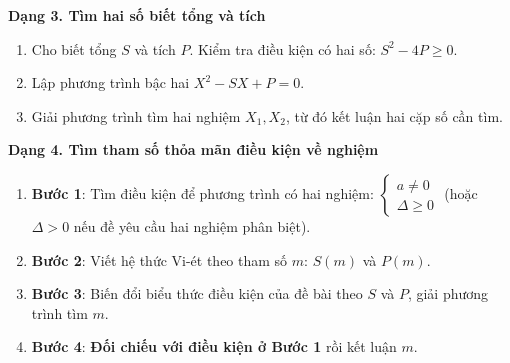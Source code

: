 \textbf{Dạng 3. Tìm hai số biết tổng và tích}
\begin{enumerate}
\item Cho biết tổng $S$ và tích $P$. Kiểm tra điều kiện có hai số: $S^2 - 4P \ge 0$.
\item Lập phương trình bậc hai $X^2 - SX + P = 0$.
\item Giải phương trình tìm hai nghiệm $X_1, X_2$, từ đó kết luận hai cặp số cần tìm.
\end{enumerate}

\textbf{Dạng 4. Tìm tham số thỏa mãn điều kiện về nghiệm}
\begin{enumerate}
\item \textbf{Bước 1}: Tìm điều kiện để phương trình có hai nghiệm: $\boxed{\begin{cases} a \ne 0 \\ \Delta \ge 0 \end{cases}}$ (hoặc $\Delta > 0$ nếu đề yêu cầu hai nghiệm phân biệt).
\item \textbf{Bước 2}: Viết hệ thức Vi-ét theo tham số $m$: $S(m)$ và $P(m)$.
\item \textbf{Bước 3}: Biến đổi biểu thức điều kiện của đề bài theo $S$ và $P$, giải phương trình tìm $m$.
\item \textbf{Bước 4}: \textbf{Đối chiếu với điều kiện ở Bước 1} rồi kết luận $m$.
\end{enumerate}
